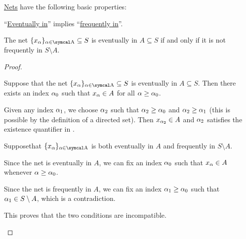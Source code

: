 \begin{proposition}\label{thm:topological_net_properties}
  \hyperref[def:topological_net]{Nets} have the following basic properties:

  \begin{propenum}
     \enquote{\hyperref[def:topological_net/eventually_in]{Eventually in}} implies \enquote{\hyperref[def:topological_net/frequently_in]{frequently in}}.

     The net \( \{ x_\al \}_{\al \in \CA} \subseteq S \) is eventually in \( A \subseteq S \) if and only if it is not frequently in \( S \setminus A \).
  \end{propenum}
\end{proposition}
\begin{proof}\mbox{}
  \begin{description}
     Suppose that the net \( \{ x_\al \}_{\al \in \CA} \subseteq S \) is eventually in \( A \subseteq S \). Then there exists an index \( \alpha_0 \) such that \( x_\alpha \in A \) for all \( \alpha \geq \alpha_0 \).

    Given any index \( \alpha_1 \), we choose \( \alpha_2 \) such that \( \alpha_2 \geq \alpha_0 \) and \( \alpha_2 \geq \alpha_1 \) (this is possible by the definition of a directed set). Then \( x_{\alpha_2} \in A \) and \( \alpha_2 \) satisfies the existence quantifier in .

     Suppose\LEM that \( \{ x_\al \}_{\al \in \CA} \) is both eventually in \( A \) and frequently in \( S \setminus A \).

    Since the net is eventually in \( A \), we can fix an index \( \alpha_0 \) such that \( x_\alpha \in A \) whenever \( \alpha \geq \alpha_0 \).

    Since the net is frequently in \( A \), we can fix an index \( \alpha_1 \geq \alpha_0 \) such that \( \alpha_1 \in S \setminus A \), which is a contradiction.

    This proves that the two conditions are incompatible.
  \end{description}
\end{proof}

